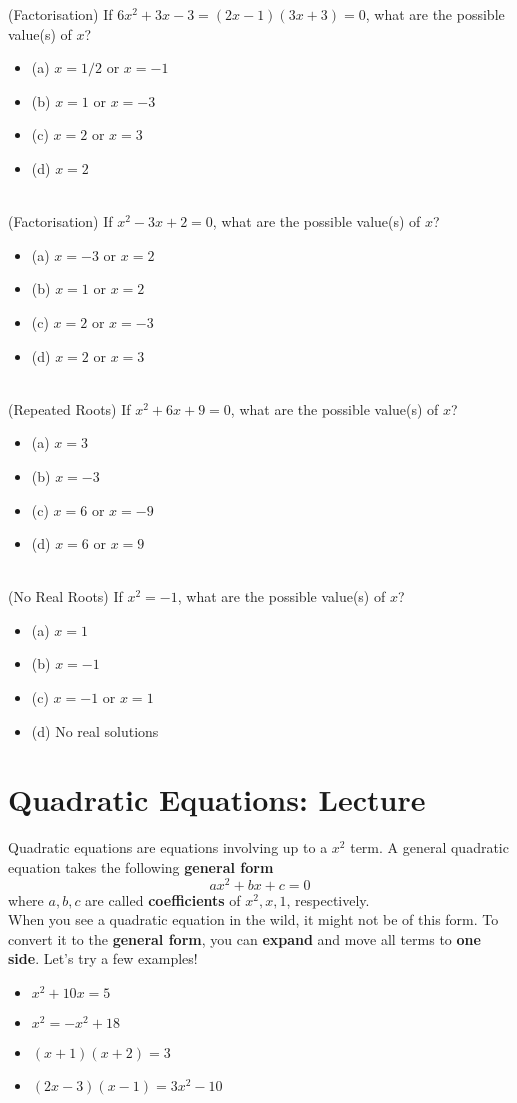 \documentclass{article}
\begin{document}
(Factorisation) If $6x^2 + 3x - 3 = (2x-1)(3x+3) = 0$, what are the possible value(s) of $x$?
\begin{itemize}
\item[](a) $x=1/2$ or $x=-1$
\item[](b) $x=1$ or $x=-3$
\item[](c) $x=2$ or $x=3$
\item[](d) $x=2$
\end{itemize}\hrulefill \\[10pt]
(Factorisation) If $x^2 - 3x + 2 = 0$, what are the possible value(s) of $x$?
\begin{itemize}
\item[](a) $x=-3$ or $x=2$
\item[](b) $x=1$ or $x=2$
\item[](c) $x=2$ or $x=-3$
\item[](d) $x=2$ or $x=3$
\end{itemize}\hrulefill \\[10pt]
\clearpage
\noindent (Repeated Roots) If $x^2 + 6x + 9 = 0$, what are the possible value(s) of $x$?
\begin{itemize}
\item[](a) $x=3$ 
\item[](b) $x=-3$ 
\item[](c) $x=6$ or $x=-9$
\item[](d) $x=6$ or $x=9$
\end{itemize}\hrulefill \\[10pt]
(No Real Roots) If $x^2 = -1$, what are the possible value(s) of $x$?
\begin{itemize}
\item[](a) $x=1$ 
\item[](b) $x=-1$ 
\item[](c) $x=-1$ or $x=1$
\item[](d) No real solutions
\end{itemize}
\clearpage \newpage
\section{Quadratic Equations: Lecture}
Quadratic equations are equations involving up to a $x^2$ term. A general quadratic equation takes the following \textbf{general form}
$$ax^2 + bx + c = 0$$
where $a,b,c$ are called \textbf{coefficients} of $x^2,x,1$, respectively.\\[10pt]
When you see a quadratic equation in the wild, it might not be of this form. To convert it to the \textbf{general form}, you can \textbf{expand} and move all terms to \textbf{one side}. Let's try a few examples!
\begin{itemize}
    \item $x^2 + 10x = 5$
    \item $x^2 = -x^2 + 18$
    \item $(x+1)(x+2) = 3$
    \item $(2x-3)(x-1) = 3x^2 - 10$
\end{itemize}
\end{document}

